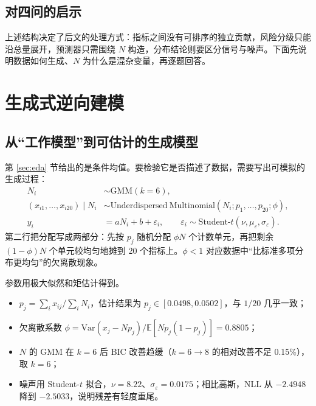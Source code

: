 \documentclass{article}
\begin{document}
\subsection{对四问的启示}
上述结构决定了后文的处理方式：指标之间没有可排序的独立贡献，风险分级只能沿总量展开，预测器只需围绕 \(N\) 构造，分布结论则要区分信号与噪声。下面先说明数据如何生成、\(N\) 为什么是混杂变量，再逐题回答。

\section{生成式逆向建模}

\subsection{从“工作模型”到可估计的生成模型}
第 \ref{sec:eda} 节给出的是条件均值。要检验它是否描述了数据，需要写出可模拟的生成过程：
\[
\begin{aligned}
N_i &\sim \mathrm{GMM}(k=6),\\
(x_{i1},\dots,x_{i20})\mid N_i &\sim \mathrm{Underdispersed\ Multinomial}(N_i;p_1,\dots,p_{20};\phi),\\
y_i &= aN_i+b+\varepsilon_i,\qquad \varepsilon_i\sim \mathrm{Student\text{-}}t(\nu,\mu_\varepsilon,\sigma_\varepsilon).
\end{aligned}
\]
第二行把分配写成两部分：先按 \(p_j\) 随机分配 \(\phi N\) 个计数单元，再把剩余 \((1-\phi)N\) 个单元较均匀地摊到 20 个指标上。\(\phi<1\) 对应数据中“比标准多项分布更均匀”的欠离散现象。

参数用极大似然和矩估计得到。
\begin{itemize}
  \item \(p_j=\sum_i x_{ij}/\sum_i N_i\)，估计结果为 \(p_j\in[0.0498,0.0502]\)，与 \(1/20\) 几乎一致；
  \item 欠离散系数 \(\phi=\mathrm{Var}(x_j-Np_j)/\mathbb{E}[Np_j(1-p_j)]=0.8805\)；
  \item \(N\) 的 GMM 在 \(k=6\) 后 BIC 改善趋缓（\(k=6\to8\) 的相对改善不足 0.15\%），取 \(k=6\)；
  \item 噪声用 Student-\(t\) 拟合，\(\nu=8.22\)、\(\sigma_\varepsilon=0.0175\)；相比高斯，NLL 从 \(-2.4948\) 降到 \(-2.5033\)，说明残差有轻度重尾。
\end{itemize}
\end{document}
